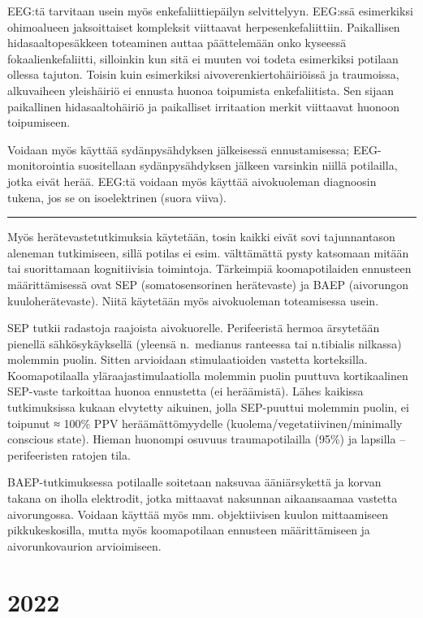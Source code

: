 \documentclass[
]{book}
\begin{document}
EEG:tä tarvitaan usein myös enkefaliittiepäilyn selvittelyyn. EEG:ssä esimerkiksi ohimoalueen jaksoittaiset kompleksit viittaavat herpesenkefaliittiin. Paikallisen hidasaaltopesäkkeen toteaminen auttaa päättelemään onko kyseessä fokaalienkefaliitti, silloinkin kun sitä ei muuten voi todeta esimerkiksi potilaan ollessa tajuton. Toisin kuin esimerkiksi aivoverenkiertohäiriöissä ja traumoissa, alkuvaiheen yleishäiriö ei ennusta huonoa toipumista enkefaliitista. Sen sijaan paikallinen hidasaaltohäiriö ja paikalliset irritaation merkit viittaavat huonoon toipumiseen.

Voidaan myös käyttää sydänpysähdyksen jälkeisessä ennustamisessa; EEG-monitorointia suositellaan sydänpysähdyksen jälkeen varsinkin niillä potilailla, jotka eivät herää. EEG:tä voidaan myös käyttää aivokuoleman diagnoosin tukena, jos se on isoelektrinen (suora viiva).

\begin{center}\rule{0.5\linewidth}{0.5pt}\end{center}

Myös herätevastetutkimuksia käytetään, tosin kaikki eivät sovi tajunnantason aleneman tutkimiseen, sillä potilas ei esim. välttämättä pysty katsomaan mitään tai suorittamaan kognitiivisia toimintoja. Tärkeimpiä koomapotilaiden ennusteen määrittämisessä ovat SEP (somatosensorinen herätevaste) ja BAEP (aivorungon kuuloherätevaste). Niitä käytetään myös aivokuoleman toteamisessa usein.

SEP tutkii radastoja raajoista aivokuorelle. Perifeeristä hermoa ärsytetään pienellä sähkösykäyksellä (yleensä n.~medianus ranteessa tai n.tibialis nilkassa) molemmin puolin. Sitten arvioidaan stimulaatioiden vastetta korteksilla. Koomapotilaalla yläraajastimulaatiolla molemmin puolin puuttuva kortikaalinen SEP-vaste tarkoittaa huonoa ennustetta (ei heräämistä). Lähes kaikissa tutkimuksissa kukaan elvytetty aikuinen, jolla SEP-puuttui molemmin puolin, ei toipunut ≈ 100\% PPV heräämättömyydelle (kuolema/vegetatiivinen/minimally conscious state). Hieman huonompi osuvuus traumapotilailla (95\%) ja lapsilla -- perifeeristen ratojen tila.

BAEP-tutkimuksessa potilaalle soitetaan naksuvaa ääniärsykettä ja korvan takana on iholla elektrodit, jotka mittaavat naksunnan aikaansaamaa vastetta aivorungossa. Voidaan käyttää myös mm. objektiivisen kuulon mittaamiseen pikkukeskosilla, mutta myös koomapotilaan ennusteen määrittämiseen ja aivorunkovaurion arvioimiseen.

\chapter{2022}\label{section-4}
\end{document}
